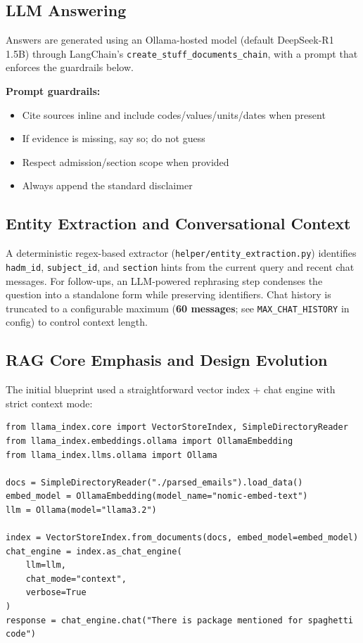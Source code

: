 \subsection{LLM Answering}
Answers are generated using an Ollama-hosted model (default DeepSeek-R1 1.5B) through LangChain's \texttt{create\_stuff\_documents\_chain}, with a prompt that enforces the guardrails below.

\noindent \textbf{Prompt guardrails:}
\begin{itemize}
  \item Cite sources inline and include codes/values/units/dates when present
  \item If evidence is missing, say so; do not guess
  \item Respect admission/section scope when provided
  \item Always append the standard disclaimer
\end{itemize}

\subsection{Entity Extraction and Conversational Context}
A deterministic regex-based extractor (\texttt{helper/entity\_extraction.py}) identifies \texttt{hadm\_id}, \texttt{subject\_id}, and \texttt{section} hints from the current query and recent chat messages. For follow-ups, an LLM-powered rephrasing step condenses the question into a standalone form while preserving identifiers. Chat history is truncated to a configurable maximum (\textbf{60 messages}; see \texttt{MAX\_CHAT\_HISTORY} in config) to control context length.

\subsection{RAG Core Emphasis and Design Evolution}
The initial blueprint used a straightforward vector index + chat engine with strict context mode:
\begin{verbatim}
from llama_index.core import VectorStoreIndex, SimpleDirectoryReader
from llama_index.embeddings.ollama import OllamaEmbedding
from llama_index.llms.ollama import Ollama

docs = SimpleDirectoryReader("./parsed_emails").load_data()
embed_model = OllamaEmbedding(model_name="nomic-embed-text")
llm = Ollama(model="llama3.2")

index = VectorStoreIndex.from_documents(docs, embed_model=embed_model)
chat_engine = index.as_chat_engine(
    llm=llm,
    chat_mode="context",
    verbose=True
)
response = chat_engine.chat("There is package mentioned for spaghetti code")
\end{verbatim}

